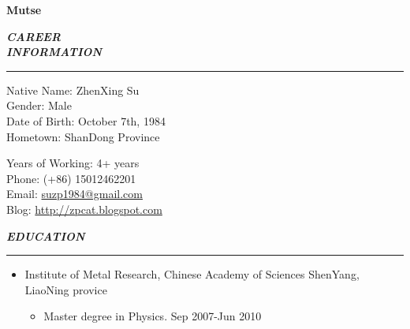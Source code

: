 \documentclass[a4paper, 10pt, titlepage]{article}
\newcommand{\wuhao}{\fontsize{10.5pt}{10.5pt}\selectfont}   %
\begin{document}
\renewcommand{\normalsize}{\wuhao}         %

\setlength{\parindent}{0em}                    
\newcommand{\mysection}[1]{\vspace{5pt} {\bfseries \textsl{#1}} \\ {\color{gray} \rule[5pt]{\textwidth}{0.3pt}}}
\renewcommand{\labelitemi}{$\bullet$}

\newcommand{\cvtitle}[1]{\centerline{\huge \textbf{#1}} \bigskip}
\newcommand{\career}[2]{\vspace{5pt} {{\bfseries \textsl{#1}} \hspace{5pt} {\normalsize{#2}}} \\}
\pagestyle{empty}

\cvtitle{Mutse}
\career{CAREER}{Linux Software Engineer}

\mysection{INFORMATION}
\begin{minipage}[t]{0.495\textwidth}
  Native Name: ZhenXing Su \\
  Gender: Male \\
  Date of Birth: October 7th, 1984\\
  Hometown: ShanDong Province
\end{minipage}
\begin{minipage}[t]{0.495\textwidth}
  Years of Working: 4+ years\\
  Phone: (+86) 15012462201 \\
  Email: \href{mailto:suzp1984@gmail.com}{suzp1984@gmail.com} \\
  Blog: \href{http://zpcat.blogspot.com}{http://zpcat.blogspot.com}
\end{minipage}

\vspace{3mm}
\mysection{EDUCATION}

\begin{itemize}

\item Institute of Metal Research, Chinese Academy of Sciences \hfill \textrm{ShenYang, LiaoNing provice}
  \begin{itemize}
    \item Master degree in Physics. \hfill \textrm{Sep 2007-Jun 2010}
  \end{itemize}
\end{itemize}
\end{document}
